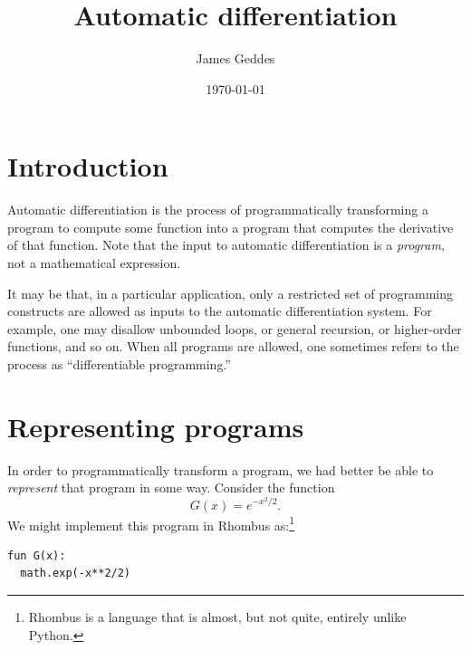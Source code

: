 \documentclass[11pt, a4paper]{article}
\title{Automatic differentiation}
\author{James Geddes}
\date{\today}
\begin{document}
\maketitle

\section{Introduction}

Automatic differentiation is the process of programmatically
transforming a program to compute some function into a program that
computes the derivative of that function. Note that the input to
automatic differentiation is a \emph{program}, not a mathematical
expression.

It may be that, in a particular application, only a restricted set of
programming constructs are allowed as inputs to the automatic
differentiation system. For example, one may disallow unbounded loops,
or general recursion, or higher-order functions, and so on. When all
programs are allowed, one sometimes refers to the process as
``differentiable programming.''

\section{Representing programs}

In order to programmatically transform a program, we had better be
able to \emph{represent} that program in some way. Consider the
function
\begin{equation}
  \label{eq:gaussian-example}
  G(x) = e^{-x^2/2}.
\end{equation}
We might implement this program in Rhombus as:\footnote{Rhombus is
  a language that is almost, but not quite, entirely unlike Python.}
\begin{verbatim}
fun G(x):
  math.exp(-x**2/2)
\end{verbatim}
\end{document}
